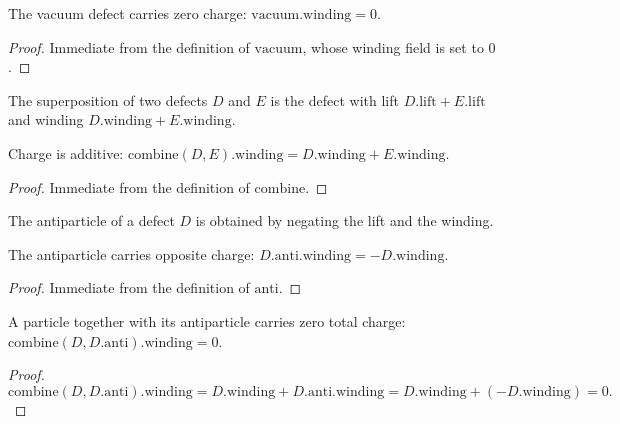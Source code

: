 \begin{theorem}
The vacuum defect carries zero charge: $\mathrm{vacuum}.\mathrm{winding} = 0$.
\end{theorem}
\begin{proof}
Immediate from the definition of $\mathrm{vacuum}$, whose winding field is
set to $0$.
\end{proof}

\begin{definition}
The superposition of two defects $D$ and $E$ is the defect with lift $D.\mathrm{lift} + E.\mathrm{lift}$ and winding $D.\mathrm{winding} + E.\mathrm{winding}$.
\end{definition}

\begin{theorem}
Charge is additive: $\mathrm{combine}(D, E).\mathrm{winding} = D.\mathrm{winding} + E.\mathrm{winding}$.
\end{theorem}

\begin{proof}
Immediate from the definition of $\mathrm{combine}$.
\end{proof}

\begin{definition}
The antiparticle of a defect $D$ is obtained by negating the lift and the winding.
\end{definition}

\begin{theorem}
The antiparticle carries opposite charge: $D.\mathrm{anti}.\mathrm{winding} = -D.\mathrm{winding}$.
\end{theorem}

\begin{proof}
Immediate from the definition of $\mathrm{anti}$.
\end{proof}

\begin{theorem}
A particle together with its antiparticle carries zero total charge: $\mathrm{combine}(D, D.\mathrm{anti}).\mathrm{winding} = 0$.
\end{theorem}

\begin{proof}
\[ \mathrm{combine}(D, D.\mathrm{anti}).\mathrm{winding} = D.\mathrm{winding} + D.\mathrm{anti}.\mathrm{winding} = D.\mathrm{winding} + (-D.\mathrm{winding}) = 0. \]
\end{proof}

